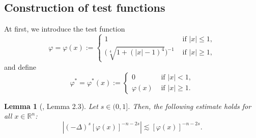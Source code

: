 \documentclass[11pt,reqno]{amsart}
\numberwithin{equation}{section}
\newtheorem{lemma}[theorem]{Lemma}
\theoremstyle{plain}
\begin{document}
\subsection{Construction of test functions} \label{Testfucntions.Sec}
At first, we introduce the test function
\[
\varphi=\varphi(x):=
\begin{cases}
1 & \text{ if $|x|\leq 1$}, \\
\big(\sqrt[4]{1+(|x|-1)^4}\big)^{-1} & \text{ if $|x|\geq 1$},
\end{cases}
\]
and define
\[
\varphi^*= \varphi^*(x):=
\begin{cases}
0 &\text{ if $|x|<1$}, \\
\varphi(x) &\text{ if $|x|\geq 1$}.
\end{cases}
\]
\begin{lemma}[\cite{AnhFino}, Lemma 2.3]\label{lem9} Let $s\in (0,1]$. Then, the following estimate holds for all $x \in \mathbb{R}^n$:
$$
\left|(-\Delta)^{s}[\varphi(x)]^{-n-2s}\right| \lesssim [\varphi(x)]^{-n-2s}.
$$
\end{lemma}
\end{document}
